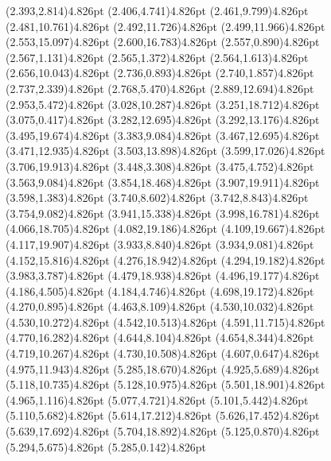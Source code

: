 \documentclass[10pt]{article}
\begin{document}
{{\qdisk(2.393,2.814){4.826pt}%
\qdisk(2.406,4.741){4.826pt}%
\qdisk(2.461,9.799){4.826pt}%
\qdisk(2.481,10.761){4.826pt}%
\qdisk(2.492,11.726){4.826pt}%
\qdisk(2.499,11.966){4.826pt}%
\qdisk(2.553,15.097){4.826pt}%
\qdisk(2.600,16.783){4.826pt}%
\qdisk(2.557,0.890){4.826pt}%
\qdisk(2.567,1.131){4.826pt}%
\qdisk(2.565,1.372){4.826pt}%
\qdisk(2.564,1.613){4.826pt}%
\qdisk(2.656,10.043){4.826pt}%
\qdisk(2.736,0.893){4.826pt}%
\qdisk(2.740,1.857){4.826pt}%
\qdisk(2.737,2.339){4.826pt}%
\qdisk(2.768,5.470){4.826pt}%
\qdisk(2.889,12.694){4.826pt}%
\qdisk(2.953,5.472){4.826pt}%
\qdisk(3.028,10.287){4.826pt}%
\qdisk(3.251,18.712){4.826pt}%
\qdisk(3.075,0.417){4.826pt}%
\qdisk(3.282,12.695){4.826pt}%
\qdisk(3.292,13.176){4.826pt}%
\qdisk(3.495,19.674){4.826pt}%
\qdisk(3.383,9.084){4.826pt}%
\qdisk(3.467,12.695){4.826pt}%
\qdisk(3.471,12.935){4.826pt}%
\qdisk(3.503,13.898){4.826pt}%
\qdisk(3.599,17.026){4.826pt}%
\qdisk(3.706,19.913){4.826pt}%
\qdisk(3.448,3.308){4.826pt}%
\qdisk(3.475,4.752){4.826pt}%
\qdisk(3.563,9.084){4.826pt}%
\qdisk(3.854,18.468){4.826pt}%
\qdisk(3.907,19.911){4.826pt}%
\qdisk(3.598,1.383){4.826pt}%
\qdisk(3.740,8.602){4.826pt}%
\qdisk(3.742,8.843){4.826pt}%
\qdisk(3.754,9.082){4.826pt}%
\qdisk(3.941,15.338){4.826pt}%
\qdisk(3.998,16.781){4.826pt}%
\qdisk(4.066,18.705){4.826pt}%
\qdisk(4.082,19.186){4.826pt}%
\qdisk(4.109,19.667){4.826pt}%
\qdisk(4.117,19.907){4.826pt}%
\qdisk(3.933,8.840){4.826pt}%
\qdisk(3.934,9.081){4.826pt}%
\qdisk(4.152,15.816){4.826pt}%
\qdisk(4.276,18.942){4.826pt}%
\qdisk(4.294,19.182){4.826pt}%
\qdisk(3.983,3.787){4.826pt}%
\qdisk(4.479,18.938){4.826pt}%
\qdisk(4.496,19.177){4.826pt}%
\qdisk(4.186,4.505){4.826pt}%
\qdisk(4.184,4.746){4.826pt}%
\qdisk(4.698,19.172){4.826pt}%
\qdisk(4.270,0.895){4.826pt}%
\qdisk(4.463,8.109){4.826pt}%
\qdisk(4.530,10.032){4.826pt}%
\qdisk(4.530,10.272){4.826pt}%
\qdisk(4.542,10.513){4.826pt}%
\qdisk(4.591,11.715){4.826pt}%
\qdisk(4.770,16.282){4.826pt}%
\qdisk(4.644,8.104){4.826pt}%
\qdisk(4.654,8.344){4.826pt}%
\qdisk(4.719,10.267){4.826pt}%
\qdisk(4.730,10.508){4.826pt}%
\qdisk(4.607,0.647){4.826pt}%
\qdisk(4.975,11.943){4.826pt}%
\qdisk(5.285,18.670){4.826pt}%
\qdisk(4.925,5.689){4.826pt}%
\qdisk(5.118,10.735){4.826pt}%
\qdisk(5.128,10.975){4.826pt}%
\qdisk(5.501,18.901){4.826pt}%
\qdisk(4.965,1.116){4.826pt}%
\qdisk(5.077,4.721){4.826pt}%
\qdisk(5.101,5.442){4.826pt}%
\qdisk(5.110,5.682){4.826pt}%
\qdisk(5.614,17.212){4.826pt}%
\qdisk(5.626,17.452){4.826pt}%
\qdisk(5.639,17.692){4.826pt}%
\qdisk(5.704,18.892){4.826pt}%
\qdisk(5.125,0.870){4.826pt}%
\qdisk(5.294,5.675){4.826pt}%
\qdisk(5.285,0.142){4.826pt}%
}}
\end{document}
